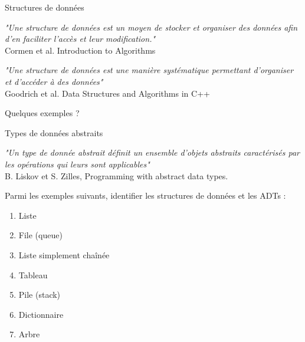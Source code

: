 \documentclass[handout]{beamer}
\begin{document}
\begin{frame}[t]{Structures de données}
    \begin{flushright}
        \textit{"Une structure de données est un moyen de stocker et organiser des données afin d'en faciliter l'accès et leur modification."}\\
        Cormen et al. Introduction to Algorithms
    \end{flushright}

    \vfill

    \begin{flushright}
        \textit{"Une structure de données est une manière systématique permettant d'organiser et d'accéder à des données"}\\
        Goodrich et al. Data Structures and Algorithms in C++
    \end{flushright}
    
    \vfill

    Quelques exemples ?
    
\end{frame}

\begin{frame}[t]{Types de données abstraits}
    \begin{flushright}
        \textit{"Un type de donnée abstrait définit un ensemble d'objets abstraits caractérisés par les opérations qui leurs sont applicables"}\\
        B. Liskov et S. Zilles, Programming with abstract data types.
    \end{flushright}

    Parmi les exemples suivants, identifier les structures de données et les ADTs :

    \begin{enumerate}
        \item Liste
        \item File (queue)
        \item Liste simplement chaînée
        \item Tableau
        \item Pile (stack)
        \item Dictionnaire
        \item Arbre
    \end{enumerate}
\end{frame}
\end{document}
